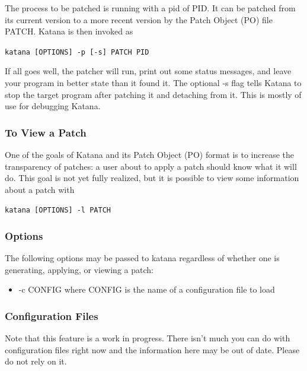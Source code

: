 \documentclass[11pt]{article}
\begin{document}
    The process to be patched is running with a pid of PID. It can be
    patched from its current version to a more recent version by the
    Patch Object (PO) file PATCH. Katana is then invoked as

    \texttt{katana [OPTIONS] -p [-s] PATCH PID}

    If all goes well, the patcher will run, print out some status
    messages, and leave your program in better state than it found
    it. The optional -s flag tells Katana to stop the target program
    after patching it and detaching from it. This is mostly of use for
    debugging Katana.
\subsubsection{To View a Patch}
\label{sec-3.5.6}

    One of the goals of Katana and its Patch Object (PO) format is to
    increase the transparency of patches: a user about to apply a patch
    should know what it will do. This goal is not yet fully realized,
    but it is possible to view some information about a patch with

    \texttt{katana [OPTIONS] -l PATCH}
\subsubsection{Options}
\label{sec-3.5.7}

    The following options may be passed to katana regardless of whether
    one is generating, applying, or viewing a patch:
\begin{itemize}
\item -c CONFIG
      where CONFIG is the name of a configuration file to load
\end{itemize}
\subsubsection{Configuration Files}
\label{sec-3.5.8}

    Note that this feature is a work in progress. There isn't much you
   can do with configuration files right now and the information here
   may be out of date. Please do not rely on it.
\end{document}
